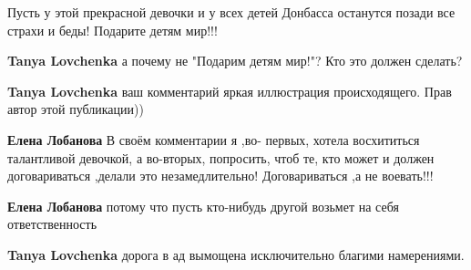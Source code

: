 \begin{itemize}
Пусть у этой прекрасной девочки и у всех детей Донбасса останутся позади все страхи и беды! Подарите детям мир!!!

\begin{itemize}
 
\textbf{Tanya Lovchenka} а почему не "Подарим детям мир!"? Кто это должен сделать?

 
\textbf{Tanya Lovchenka} ваш комментарий яркая иллюстрация происходящего. Прав автор этой публикации))

 
\textbf{Елена Лобанова} В своём комментарии я ,во- первых, хотела восхититься талантливой девочкой, а во-вторых, попросить, чтоб те, кто может и должен договариваться ,делали это незамедлительно! Договариваться ,а не воевать!!!

 
\textbf{Елена Лобанова} потому что пусть кто-нибудь другой возьмет на себя ответственность

 
\textbf{Tanya Lovchenka} дорога в ад вымощена исключительно благими намерениями.
 

\end{itemize}
\end{itemize}
